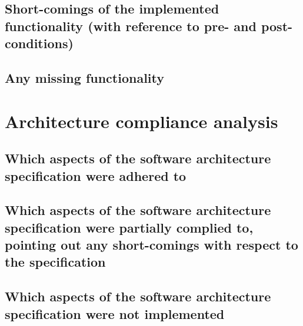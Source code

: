\documentclass{article}
\begin{document}
\subsection{Short-comings of the implemented functionality (with reference to pre- and post-conditions)}


\subsection{Any missing functionality}



\section{Architecture compliance analysis}
\subsection{Which aspects of the software architecture specification were adhered to}


\subsection{Which aspects of the software architecture specification were partially complied to, pointing out any short-comings with respect to the specification}


\subsection{Which aspects of the software architecture specification were not implemented}
\end{document}
